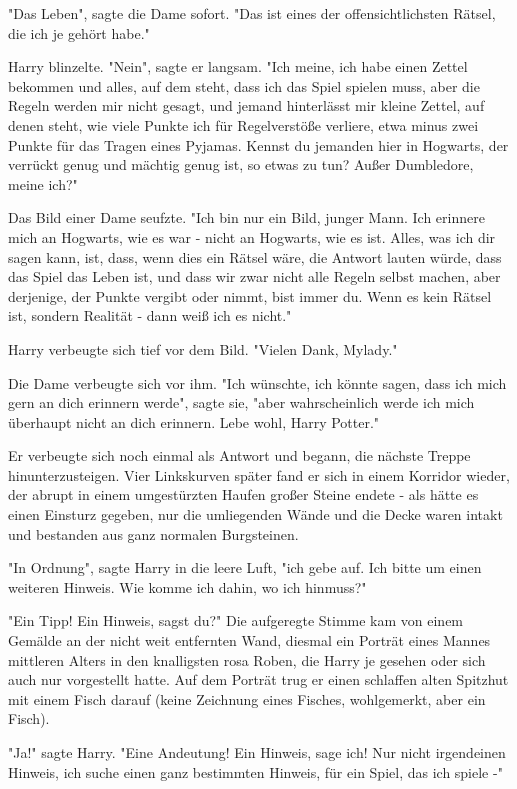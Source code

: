 {"Das Leben", sagte die Dame sofort. "Das ist eines der offensichtlichsten Rätsel, die ich je gehört habe."

Harry blinzelte. "Nein", sagte er langsam. "Ich meine, ich habe einen Zettel bekommen und alles, auf dem steht, dass ich das Spiel spielen muss, aber die Regeln werden mir nicht gesagt, und jemand hinterlässt mir kleine Zettel, auf denen steht, wie viele Punkte ich für Regelverstöße verliere, etwa minus zwei Punkte für das Tragen eines Pyjamas. Kennst du jemanden hier in Hogwarts, der verrückt genug und mächtig genug ist, so etwas zu tun? Außer Dumbledore, meine ich?"

Das Bild einer Dame seufzte. "Ich bin nur ein Bild, junger Mann. Ich erinnere mich an Hogwarts, wie es war - nicht an Hogwarts, wie es ist. Alles, was ich dir sagen kann, ist, dass, wenn dies ein Rätsel wäre, die Antwort lauten würde, dass das Spiel das Leben ist, und dass wir zwar nicht alle Regeln selbst machen, aber derjenige, der Punkte vergibt oder nimmt, bist immer du. Wenn es kein Rätsel ist, sondern Realität - dann weiß ich es nicht."

Harry verbeugte sich tief vor dem Bild. "Vielen Dank, Mylady."

Die Dame verbeugte sich vor ihm. "Ich wünschte, ich könnte sagen, dass ich mich gern an dich erinnern werde", sagte sie, "aber wahrscheinlich werde ich mich überhaupt nicht an dich erinnern. Lebe wohl, Harry Potter."

Er verbeugte sich noch einmal als Antwort und begann, die nächste Treppe hinunterzusteigen. Vier Linkskurven später fand er sich in einem Korridor wieder, der abrupt in einem umgestürzten Haufen großer Steine endete - als hätte es einen Einsturz gegeben, nur die umliegenden Wände und die Decke waren intakt und bestanden aus ganz normalen Burgsteinen.

"In Ordnung", sagte Harry in die leere Luft, "ich gebe auf. Ich bitte um einen weiteren Hinweis. Wie komme ich dahin, wo ich hinmuss?"

"Ein Tipp! Ein Hinweis, sagst du?" Die aufgeregte Stimme kam von einem Gemälde an der nicht weit entfernten Wand, diesmal ein Porträt eines Mannes mittleren Alters in den knalligsten rosa Roben, die Harry je gesehen oder sich auch nur vorgestellt hatte. Auf dem Porträt trug er einen schlaffen alten Spitzhut mit einem Fisch darauf (keine Zeichnung eines Fisches, wohlgemerkt, aber ein Fisch).

"Ja!" sagte Harry. "Eine Andeutung! Ein Hinweis, sage ich! Nur nicht irgendeinen Hinweis, ich suche einen ganz bestimmten Hinweis, für ein Spiel, das ich spiele -"

}

